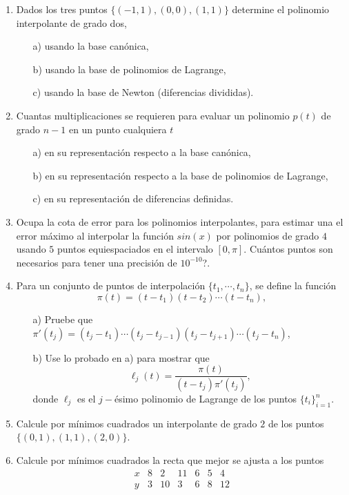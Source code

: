 \documentclass[11pt]{article}
\begin{document}
\begin{enumerate}

\item Dados los tres puntos $\{(-1,1),(0,0),(1,1)\}$ determine el polinomio interpolante de grado dos,
\begin{itemize}
 \item[a)] usando la base can\'onica,
 \item[b)] usando la base de polinomios de Lagrange,
 \item[c)] usando la base de Newton (diferencias divididas).
\end{itemize}

\item Cuantas multiplicaciones se requieren para evaluar un polinomio $p(t)$ 
de grado $n-1$ en un punto cualquiera $t$ 
\begin{itemize}
 \item[a)] en su representaci\'on respecto a la base can\'onica,
 \item[b)] en su representaci\'on respecto a la base de polinomios de Lagrange,
 \item[c)] en su representaci\'on de diferencias definidas.
\end{itemize}

\item Ocupa la cota de error para los polinomios interpolantes, para estimar una 
el error m\'aximo al interpolar la funci\'on $sin(x)$ por polinomios de grado $4$ usando 
$5$ puntos equiespaciados en el intervalo $[0,\pi]$. \textquestiondown Cu\'antos puntos son 
necesarios para tener una precisi\'on de $10^{-10}$?.

\item Para un conjunto de puntos de interpolaci\'on $\{t_1,\cdots,t_n\}$, se define la funci\'on
$$
\pi(t)=(t-t_1)(t-t_2)\cdots (t-t_n),
$$
\begin{itemize}
 \item[a)] Pruebe que $\pi'(t_j)=(t_j-t_1)\cdots (t_j-t_{j-1})(t_j-t_{j+1})\cdots (t_j-t_n)$,
 \item[b)] Use lo probado en a) para mostrar que
 $$
 \ell_j(t)=\frac{\pi(t)}{(t-t_j)\pi'(t_j)},
 $$
 donde $\ell_j$ es el $j-$\'esimo polinomio de Lagrange de los puntos $\{t_i\}_{i=1}^n$.
\end{itemize}

\item
Calcule por m\'inimos cuadrados un interpolante de grado $2$ de los puntos $\{(0,1),(1,1),(2,0)\}$.

\item
Calcule por m\'inimos cuadrados la recta que mejor se ajusta a los puntos
$$
\begin{array}{c||c|c|c|c|c|c|c|}
 x	& 8 & 2 & 11 & 6 & 5 & 4
 \\
 \hline
 y	& 3 & 10&  3 & 6 & 8 & 12
 \end{array}$$

\end{enumerate}
\end{document}
